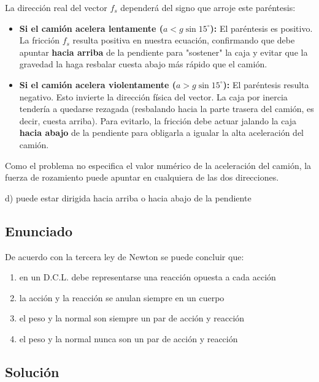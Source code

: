 \documentclass[12pt, a4paper]{article}
\begin{document}
La dirección real del vector $f_s$ dependerá del signo que arroje este paréntesis:
\begin{itemize}
    \item \textbf{Si el camión acelera lentamente ($a < g \sin 15^\circ$):} El paréntesis es positivo. La fricción $f_s$ resulta positiva en nuestra ecuación, confirmando que debe apuntar \textbf{hacia arriba} de la pendiente para "sostener" la caja y evitar que la gravedad la haga resbalar cuesta abajo más rápido que el camión.
    \item \textbf{Si el camión acelera violentamente ($a > g \sin 15^\circ$):} El paréntesis resulta negativo. Esto invierte la dirección física del vector. La caja por inercia tendería a quedarse rezagada (resbalando hacia la parte trasera del camión, es decir, cuesta arriba). Para evitarlo, la fricción debe actuar jalando la caja \textbf{hacia abajo} de la pendiente para obligarla a igualar la alta aceleración del camión.
\end{itemize}
Como el problema no especifica el valor numérico de la aceleración del camión, la fuerza de rozamiento puede apuntar en cualquiera de las dos direcciones.

\begin{tcolorbox}[colback=green!5!white, colframe=green!50!black, title=Respuesta Final]
\centering \Large d) puede estar dirigida hacia arriba o hacia abajo de la pendiente
\end{tcolorbox}

\newpage

\subsection*{Enunciado}
De acuerdo con la tercera ley de Newton se puede concluir que:
\begin{enumerate}[label=\alph*)]
    \item en un D.C.L. debe representarse una reacción opuesta a cada acción
    \item la acción y la reacción se anulan siempre en un cuerpo
    \item el peso y la normal son siempre un par de acción y reacción
    \item el peso y la normal nunca son un par de acción y reacción
\end{enumerate}

\subsection*{Solución}
\end{document}
